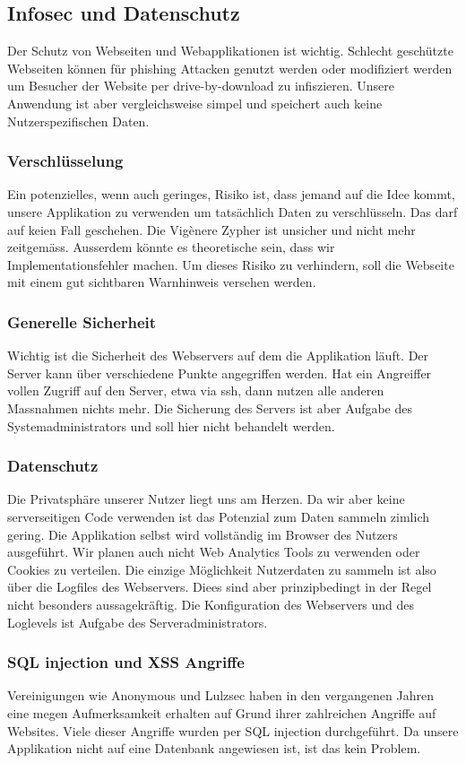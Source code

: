 \documentclass[11pt,paper=a4,final]{scrartcl}
\begin{document}
\subsection{Infosec und Datenschutz}
Der Schutz von Webseiten und Webapplikationen ist wichtig. Schlecht gesch\"utzte
Webseiten k\"onnen f\"ur phishing Attacken genutzt werden oder modifiziert
werden um Besucher der Website per drive-by-download zu infiszieren. Unsere
Anwendung ist aber vergleichsweise simpel und speichert auch keine
Nutzerspezifischen Daten.
\subsubsection{Verschl\"usselung}
Ein potenzielles, wenn auch geringes, Risiko ist, dass jemand auf die Idee
kommt, unsere Applikation zu verwenden um tats\"achlich Daten zu
verschl\"usseln. Das darf auf keien Fall geschehen. Die Vig\`enere Zypher ist
unsicher und nicht mehr zeitgem\"ass. Ausserdem k\"onnte es theoretische sein,
dass wir Implementationsfehler machen. Um dieses Risiko zu verhindern, soll die
Webseite mit einem gut sichtbaren Warnhinweis versehen werden.
\subsubsection{Generelle Sicherheit}
Wichtig ist die Sicherheit des Webservers auf dem die Applikation l\"auft. Der
Server kann \"uber verschiedene Punkte angegriffen werden. Hat ein Angreiffer
vollen Zugriff auf den Server, etwa via ssh, dann nutzen alle anderen Massnahmen
nichts mehr. Die Sicherung des Servers ist aber Aufgabe des Systemadministrators
und soll hier nicht behandelt werden.
\subsubsection{Datenschutz}
Die Privatsph\"are unserer Nutzer liegt uns am Herzen. Da wir aber keine
serverseitigen Code verwenden ist das Potenzial zum Daten sammeln zimlich
gering. Die Applikation selbst wird vollst\"andig im Browser des Nutzers
ausgef\"uhrt. Wir planen auch nicht Web Analytics Tools zu verwenden oder
Cookies zu verteilen. Die einzige M\"oglichkeit Nutzerdaten zu sammeln ist also
\"uber die Logfiles des Webservers. Diees sind aber prinzipbedingt in der Regel
nicht besonders aussagekr\"aftig. Die Konfiguration des Webservers und des
Loglevels ist Aufgabe des Serveradministrators.
\subsubsection{SQL injection und XSS Angriffe}
Vereinigungen wie Anonymous und Lulzsec haben in den vergangenen Jahren eine
megen Aufmerksamkeit erhalten auf Grund ihrer zahlreichen Angriffe auf Websites.
Viele dieser Angriffe wurden per SQL injection durchgef\"uhrt. Da unsere
Applikation nicht auf eine Datenbank angewiesen ist, ist das kein Problem.
\end{document}
